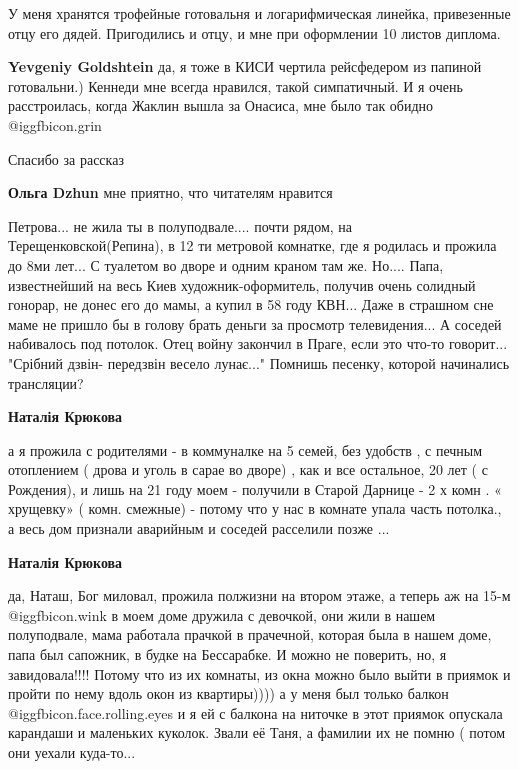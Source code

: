 \begin{itemize}
У меня хранятся трофейные готовальня и логарифмическая линейка, привезенные
отцу его дядей. Пригодились и отцу, и мне при оформлении 10 листов диплома.

\begin{itemize} %
\textbf{Yevgeniy Goldshtein} да, я тоже в КИСИ чертила рейсфедером из папиной готовальни.)
Кеннеди мне всегда нравился, такой симпатичный. И я очень расстроилась, когда Жаклин вышла за Онасиса, мне было так обидно @igg{fbicon.grin} 
\end{itemize} %

Спасибо за рассказ

\begin{itemize} %
\textbf{Ольга Dzhun} мне приятно, что читателям нравится
\end{itemize} %

Петрова...
не жила ты в полуподвале....
почти рядом, на Терещенковской(Репина), в 12 ти метровой комнатке, где я родилась и прожила до 8ми лет...
С туалетом во дворе и одним краном там же.
Но....
Папа, известнейший на весь Киев художник-оформитель, получив очень солидный гонорар, не донес его до мамы, а купил в 58 году КВН...
Даже в страшном сне маме не пришло бы в голову брать деньги за просмотр телевидения...
А соседей набивалось под потолок.
Отец войну закончил в Праге, если это что-то говорит...
"Срібний дзвін- передзвін весело лунає..."
Помнишь песенку, которой начинались трансляции?

\begin{itemize} %
\textbf{Наталія Крюкова} 

а я прожила с родителями - в коммуналке на 5 семей, без удобств , с печным
отоплением ( дрова и уголь в сарае во дворе) , как и все остальное, 20 лет ( с
Рождения), и лишь на 21 году моем - получили в Старой Дарнице - 2 х комн . «
хрущевку» ( комн. смежные) - потому что у нас в комнате упала часть потолка., а
весь дом признали аварийным и соседей расселили позже ...

\textbf{Наталія Крюкова} 

да, Наташ, Бог миловал, прожила полжизни на втором этаже, а теперь аж на 15-м
@igg{fbicon.wink} в моем доме дружила с девочкой, они жили в нашем полуподвале,
мама работала прачкой в прачечной, которая была в нашем доме, папа был
сапожник, в будке на Бессарабке. И можно не поверить, но, я завидовала!!!!
Потому что из их комнаты, из окна можно было выйти в приямок и пройти по нему
вдоль окон из квартиры)))) а у меня был только балкон
@igg{fbicon.face.rolling.eyes}  и я ей с балкона на ниточке в этот приямок
опускала карандаши и маленьких куколок. Звали её Таня, а фамилии их не помню (
потом они уехали куда-то...


\end{itemize}
\end{itemize}
